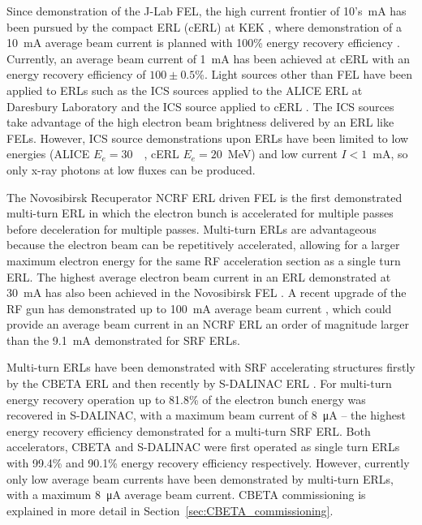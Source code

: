 \documentclass[../main.tex]{subfiles}
\begin{document}
Since demonstration of the J-Lab FEL, the high current frontier of 10's~\si{\milli\ampere} has been pursued by the compact ERL (cERL) at KEK \cite{akagi2016narrow}, where demonstration of a 10~\si{\milli\ampere} average beam current is planned with 100\% energy recovery efficiency \cite{adolphsen2022european}. Currently, an average beam current of 1~\si{\milli\ampere} has been achieved at cERL \cite{obina20191} with an energy recovery efficiency of $100\pm 0.5$\%. Light sources other than FEL have been applied to ERLs such as the 
ICS sources applied to the ALICE ERL at Daresbury Laboratory \cite{priebe2008inverse,priebe2010first} and the ICS source applied to cERL \cite{akagi2016narrow}. The ICS sources take advantage of the high electron beam brightness delivered by an ERL like FELs. However, ICS source demonstrations upon ERLs have been limited to low energies (ALICE $E_{e}=30$~\si{\mega\electonvolt}, cERL  $E_{e}=20$~\si{\mega\electronvolt}) and low current $I < 1$~\si{\milli\ampere}, so only x-ray photons at low fluxes can be produced. 

The Novosibirsk Recuperator NCRF ERL driven FEL is the first demonstrated multi-turn ERL \cite{gavrilov2007status} in which the electron bunch is accelerated for multiple passes before deceleration for multiple passes.  Multi-turn ERLs are advantageous because the electron beam can be repetitively accelerated, allowing for a larger maximum electron energy for the same RF acceleration section as a single turn ERL. The highest average electron beam current in an ERL demonstrated at 30~\si{\milli\ampere} has also been achieved in the Novosibirsk FEL \cite{gavrilov2007status}. A recent upgrade of the RF gun has demonstrated up to 100~\si{\milli\ampere} average beam current \cite{matveev2020simulation}, which could provide an average beam current in an NCRF ERL an order of magnitude larger than the 9.1~\si{\milli\ampere} \cite{neil2006jlab} demonstrated for SRF ERLs.  

Multi-turn ERLs have been demonstrated with SRF accelerating structures firstly by the CBETA ERL \cite{bartnik2020cbeta} and then recently by S-DALINAC ERL \cite{adolphsen2022european}. For multi-turn energy recovery operation up to 81.8\% of the electron bunch energy was recovered in S-DALINAC, with a maximum beam current of 8~\si{\micro\ampere} -- the highest energy recovery efficiency demonstrated for a multi-turn SRF ERL. Both accelerators, CBETA \cite{gulliford2021measurement} and S-DALINAC
\cite{steinhorst2021rf} were first operated as single turn ERLs with 99.4\% and 90.1\% energy recovery efficiency respectively. However, currently only low average beam currents have been demonstrated by multi-turn ERLs, with a maximum 8~\si{\micro\ampere} average beam current. CBETA commissioning is explained in more detail in Section~\ref{sec:CBETA_commissioning}.
\end{document}
